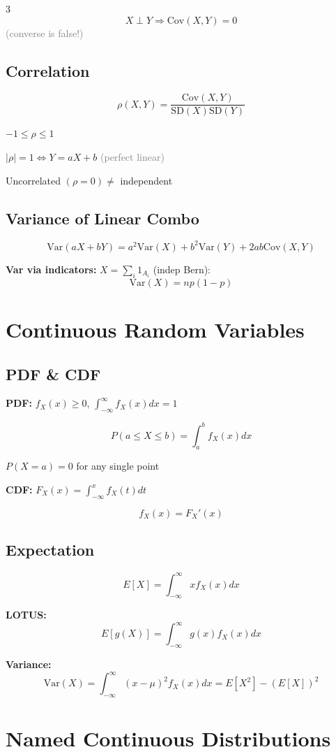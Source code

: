 \documentclass[10pt,landscape]{article}
\newcommand{\note}[1]{\textcolor{gray}{\small(#1)}}
\begin{document}
\begin{multicols}{3}
$$X \perp Y \Rightarrow \text{Cov}(X, Y) = 0$$
\note{converse is false!}

\subsection{Correlation}
$$\rho(X, Y) = \frac{\text{Cov}(X, Y)}{\text{SD}(X) \text{SD}(Y)}$$

$-1 \leq \rho \leq 1$

$|\rho| = 1 \Leftrightarrow Y = aX + b$ \note{perfect linear}

Uncorrelated $(\rho = 0) \neq$ independent

\subsection{Variance of Linear Combo}
$$\text{Var}(aX + bY) = a^2\text{Var}(X) + b^2\text{Var}(Y) + 2ab\text{Cov}(X, Y)$$

\textbf{Var via indicators:} $X = \sum_i 1_{A_i}$ (indep Bern):
$$\text{Var}(X) = np(1-p)$$

\section{Continuous Random Variables}

\subsection{PDF \& CDF}
\textbf{PDF:} $f_X(x) \geq 0$, $\int_{-\infty}^\infty f_X(x) dx = 1$

$$P(a \leq X \leq b) = \int_a^b f_X(x) dx$$

$P(X = a) = 0$ for any single point

\textbf{CDF:} $F_X(x) = \int_{-\infty}^x f_X(t) dt$

$$f_X(x) = F_X'(x)$$

\subsection{Expectation}
$$E[X] = \int_{-\infty}^\infty x f_X(x) dx$$

\textbf{LOTUS:}
$$E[g(X)] = \int_{-\infty}^\infty g(x) f_X(x) dx$$

\textbf{Variance:}
$$\text{Var}(X) = \int_{-\infty}^\infty (x - \mu)^2 f_X(x) dx = E[X^2] - (E[X])^2$$

\section{Named Continuous Distributions}


\end{multicols}
\end{document}
